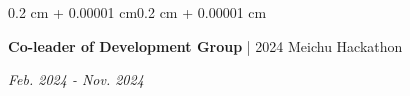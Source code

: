 \documentclass[10pt, letterpaper]{article}
\newenvironment{highlights}{
    \begin{itemize}[
        topsep=0.05 cm,
        parsep=0.05 cm,
        partopsep=0pt,
        itemsep=0pt,
        leftmargin=0.4 cm + 10pt
    ]
}{
    \end{itemize}
}
\newenvironment{onecolentry}{
    \begin{adjustwidth}{0.2 cm + 0.00001 cm}{0.2 cm + 0.00001 cm}
}{
    \end{adjustwidth}
}
\newenvironment{twocolentry}[2][]{
    \onecolentry
    \def\secondColumn{#2}
    \setcolumnwidth{\fill, 4.5 cm}
    \begin{paracol}{2}
}{
    \switchcolumn \raggedleft \secondColumn
    \end{paracol}
    \endonecolentry
}
\let\hrefWithoutArrow\href
\renewcommand{\href}[2]{\hrefWithoutArrow{#1}{\ifthenelse{\equal{#2}{}}{ }{#2 }\raisebox{.15ex}{\footnotesize \faExternalLink*}}}
\begin{document}
        
        \vspace{0.15 cm}
        \begin{twocolentry}{\textit{Feb. 2024 - Nov. 2024}}
                \textbf{Co-leader of Development Group} | 2024 Meichu Hackathon
        \end{twocolentry}
    
\end{document}
